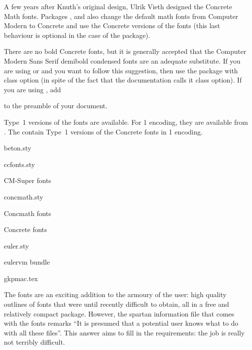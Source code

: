 A few years after Knuth's original design, Ulrik Vieth
designed the Concrete Math fonts.  Packages
, and  also change the default math
fonts from Computer Modern to Concrete and use the Concrete versions
of the  fonts (this last behaviour is optional in the case
of the  package).

There are no bold Concrete fonts, but it is generally accepted that
the Computer Modern Sans Serif demibold condensed fonts are an
adequate substitute.  If you are using  or
 and you want to follow this suggestion, then use the
package with  class option (in spite of the fact
that the  documentation calls it
 class option). If you are using ,
add
\begin{quote}
\end{quote}
to the preamble of your document.

Type~1 versions of the fonts are available.  For 1 encoding,
they are available from .  The
 contain Type~1 versions
of the Concrete fonts in 1 encoding.
\begin{ctanrefs}
\item[beton.sty]
\item[ccfonts.sty]
\item[\nothtml{\rmfamily}CM-Super fonts]
\item[concmath.sty]
\item[\nothtml{\rmfamily}Concmath fonts]
\item[\nothtml{\rmfamily}Concrete fonts]
\item[euler.sty]
\item[eulervm \nothtml{\rmfamily}bundle]
\item[gkpmac.tex]
\end{ctanrefs}


The  fonts are an exciting addition to
the armoury of the \AllTeX{} user: high quality outlines of fonts that
were until recently difficult to obtain, all in a free and
relatively compact package.  However, the spartan information file
that comes with the fonts remarks ``It is presumed that a potential
user knows what to do with all these files''.  This answer aims to
fill in the requirements: the job is really not terribly difficult.

